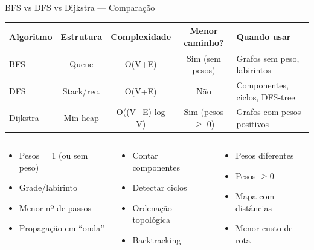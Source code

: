 \documentclass[aspectratio=169,10pt]{beamer}
\begin{document}
\begin{frame}{BFS vs DFS vs Dijkstra --- Comparação}
  \begin{tcolorbox}[caixaAzul,title={Tabela Comparativa}]
    \centering\footnotesize
    \begin{tabular}{lcccl}
      \toprule
      \textbf{Algoritmo} & \textbf{Estrutura} & \textbf{Complexidade} &
      \textbf{Menor caminho?} & \textbf{Quando usar}\\
      \midrule
      BFS       & Queue     & O(V+E)          & Sim (sem pesos)  & Grafos sem peso, labirintos\\
      DFS       & Stack/rec.& O(V+E)          & Não              & Componentes, ciclos, DFS-tree\\
      Dijkstra  & Min-heap  & O((V+E) log V)  & Sim (pesos $\ge$ 0) & Grafos com pesos positivos\\
      \bottomrule
    \end{tabular}
  \end{tcolorbox}
  \vspace{0.1cm}
  \begin{columns}[t]
      \begin{tcolorbox}[caixaLaranja,title={Use BFS quando}]
        \begin{itemize}\footnotesize
          \item Pesos = 1 (ou sem peso)
          \item Grade/labirinto
          \item Menor nº de passos
          \item Propagação em ``onda''
        \end{itemize}
      \end{tcolorbox}
      \begin{tcolorbox}[caixaDfs,title={Use DFS quando}]
        \begin{itemize}\footnotesize
          \item Contar componentes
          \item Detectar ciclos
          \item Ordenação topológica
          \item Backtracking
        \end{itemize}
      \end{tcolorbox}
      \begin{tcolorbox}[caixaRoxa,title={Use Dijkstra quando}]
        \begin{itemize}\footnotesize
          \item Pesos diferentes
          \item Pesos $\ge 0$
          \item Mapa com distâncias
          \item Menor custo de rota
        \end{itemize}
      \end{tcolorbox}
  \end{columns}
\end{frame}
\end{document}
